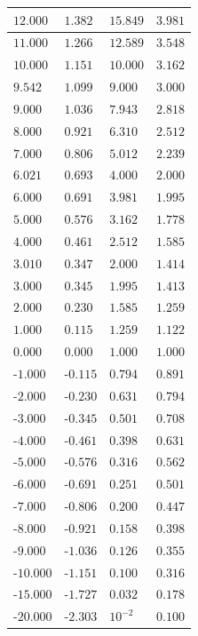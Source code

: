 \begin{center}
{\begin{tabular}{l|l|l|l}
			\textbf{$12.000$} & $1.382$ & $15.849$ & $3.981$ \\ \hline
			$11.000$ & $1.266$ & $12.589$ & $3.548$ \\ \hline
			\textbf{$10.000$} & $1.151$ & \textbf{$10.000$} & $3.162$ \\ \hline
			$9.542$ & $1.099$ & $9.000$ & $3.000$ \\ \hline
			$9.000$ & $1.036$ & $7.943$ & $2.818$ \\ \hline
			$8.000$ & $0.921$ & $6.310$ & $2.512$ \\ \hline
			$7.000$ & $0.806$ & $5.012$ & $2.239$ \\ \hline
			\textbf{$6.021$} & \textbf{$0.693$} & \textbf{$4.000$} & \textbf{$2.000$} \\ \hline
			$6.000$ & $0.691$ & $3.981$ & $1.995$ \\ \hline
			$5.000$ & $0.576$ & $3.162$ & $1.778$ \\ \hline
			$4.000$ & $0.461$ & $2.512$ & $1.585$ \\ \hline
			\textbf{$3.010$} & \textbf{$0.347$} & \textbf{$2.000$} & \textbf{$1.414$} \\ \hline
			$3.000$ & $0.345$ & $1.995$ & $1.413$ \\ \hline
			$2.000$ & $0.230$ & $1.585$ & $1.259$ \\ \hline
			$1.000$ & $0.115$ & $1.259$ & $1.122$ \\ \hline
			$0.000$ & $0.000$ & $1.000$ & $1.000$ \\ \hline
			-$1.000$ & -$0.115$ & $0.794$ & $0.891$ \\ \hline
			-$2.000$ & -$0.230$ & $0.631$ & $0.794$ \\ \hline
			-$3.000$ & -$0.345$ & $0.501$ & $0.708$ \\ \hline
			-$4.000$ & -$0.461$ & $0.398$ & $0.631$ \\ \hline
			-$5.000$ & -$0.576$ & $0.316$ & $0.562$ \\ \hline
			-$6.000$ & -$0.691$ & $0.251$ & $0.501$ \\ \hline
			-$7.000$ & -$0.806$ & $0.200$ & $0.447$ \\ \hline
			-$8.000$ & -$0.921$ & $0.158$ & $0.398$ \\ \hline
			-$9.000$ & -$1.036$ & $0.126$ & $0.355$ \\ \hline
			-$10.000$ & -$1.151$ & $0.100$ & $0.316$ \\ \hline
			-$15.000$ & -$1.727$ & $0.032$ & $0.178$ \\ \hline
			-$20.000$ & -$2.303$ & $10^{-2}$ & $0.100$ \\ \hline

\end{tabular}}
\end{center}
